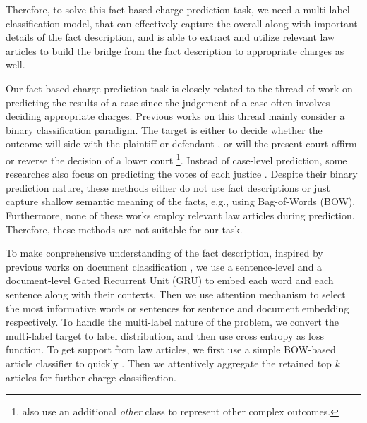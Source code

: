 Therefore, to solve this fact-based charge prediction task, we need a multi-label classification model, that can effectively capture the overall  along with important details of the fact description, and is able to extract and utilize relevant law articles to build the bridge from the fact description to appropriate charges as well. 

Our fact-based charge prediction task is closely related to the thread of work on predicting the results of a case since the judgement of a case often involves deciding appropriate charges. Previous works on this thread mainly consider a binary classification paradigm. The target is either to decide whether the outcome will side with the plaintiff or defendant \cite{aletras2016predicting}, or will the present court affirm or reverse the decision of a lower court \cite{katz2016general} \footnote{\cite{katz2016general} also use an additional \emph{other} class to represent other complex outcomes.}. Instead of case-level prediction, some researches also focus on predicting the votes of each justice \cite{martin2002dynamic,lauderdale2014scaling,sim2015utility}. Despite their binary prediction nature, these methods either do not use fact descriptions or just capture shallow semantic meaning of the facts, e.g., using Bag-of-Words (BOW). Furthermore, none of these works employ relevant law articles during prediction. Therefore, these methods are not suitable for our task. 

To make conprehensive understanding of the fact description, inspired by previous works on document classification \cite{tang2015document,yang2016hierarchical}, we use a sentence-level and a document-level Gated Recurrent Unit (GRU) to embed each word and each sentence along with their contexts. 
Then we use attention mechanism to select the most informative words or sentences for sentence and document embedding respectively. 
To handle the multi-label nature of the problem, we convert the multi-label target to label distribution, and then use cross entropy as loss function. 
To get support from law articles, we first use a simple BOW-based article classifier to quickly . Then we attentively aggregate the retained top $k$ articles for further charge classification.

